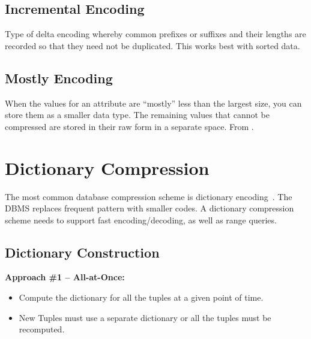 \documentclass[11pt]{article}
\begin{document}
\subsection*{Incremental Encoding}
Type of delta encoding whereby common prefixes or suffixes and their lengths are recorded 
so that they need not be duplicated. This works best with sorted data.

\subsection*{Mostly Encoding}
When the values for an attribute are ``mostly'' less than the largest size, you can store 
them as a smaller data type.
The remaining values that cannot be compressed are stored in their raw form in a separate 
space.
From .

\section{Dictionary Compression}
The most common database compression scheme is dictionary encoding~\cite{p283-binnig}.
The DBMS replaces frequent pattern with smaller codes.
A dictionary compression scheme needs to support fast encoding/decoding, as well as range queries.

\subsection*{Dictionary Construction}

\textbf{Approach \#1 -- All-at-Once:}
\begin{itemize}
    \item
    Compute the dictionary for all the tuples at a given point of time.
    
    \item
    New Tuples must use a separate dictionary or all the tuples must be recomputed.
\end{itemize}
\end{document}

